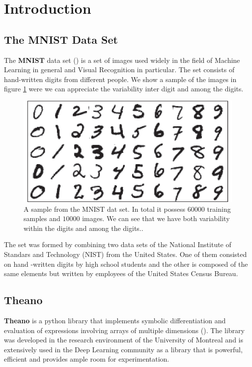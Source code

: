 \documentclass[11pt,a4paper]{article}
\begin{document}
\section{Introduction}

\subsection{The MNIST Data Set}
The \textbf{MNIST}  data set (\cite{lecun1998mnist}) is a set of images used widely in the field of Machine Learning in general and Visual Recognition in particular. The set consists of hand-written digits from different people. We show a sample of the images in figure \ref{fig:mnist_example} were we can appreciate the variability inter digit and among the digits. 

\begin{center}
\begin{figure}[H]
\centering
\includegraphics[scale=.45]{mnist_example.png} 
\caption{A sample from the MNIST dat set. In total it possess $60000$ training samples and $10000$ images.  We can see that we have both variability within the digits and among the digits..}
\label{fig:mnist_example}
\end{figure} 
\end{center}

The set was formed by combining two data sets of the National Institute of Standars and Technology (NIST) from the United States. One of them consisted on hand 
-written digits by high school students and the other is composed of the same elements but written by employees of the United States Census Bureau. 

\subsection{Theano}
\textbf{Theano} is a python library that implements symbolic differentiation and evaluation of expressions involving arrays of multiple dimensions (\cite{bergstra2010theano}). The library was developed in the research environment of the University of Montreal and is extensively used in the Deep Learning community as a library that is powerful, efficient and provides ample room for experimentation. 
\end{document}
